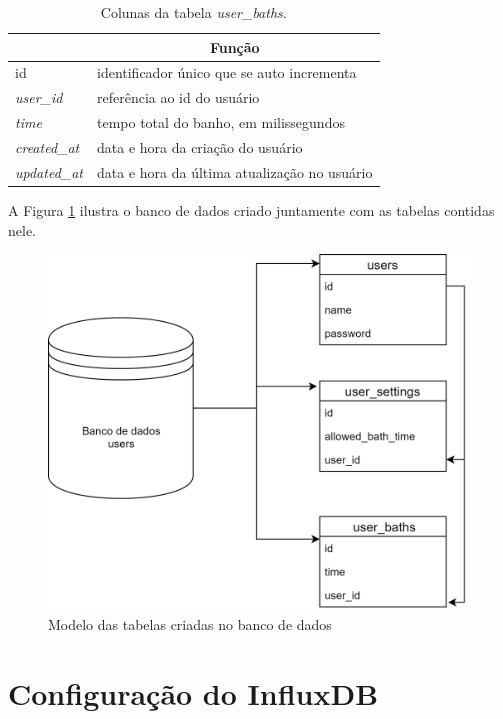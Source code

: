\begin{table}[]
	\centering
	\begin{tabular}{|l|l|}
		\hline
		\rowcolor[HTML]{ECF4FF} 
		\multicolumn{1}{|c|}{\cellcolor[HTML]{ECF4FF}Coluna} & \multicolumn{1}{c|}{\cellcolor[HTML]{ECF4FF}Função} \\ \hline
		id                                                   & identificador único que se auto incrementa          \\ \hline
		\textit{user\_id}                                    & referência ao id do usuário                         \\ \hline
		\textit{time}                                        & tempo total do banho, em milissegundos              \\ \hline
		\textit{created\_at}                                 & data e hora da criação do usuário                   \\ \hline
		\textit{updated\_at}                                 & data e hora da última atualização no usuário        \\ \hline
	\end{tabular}
	\caption{Colunas da tabela \textit{user\_baths}.}
	\label{tab:user-baths}
\end{table}

A Figura \ref{fig:modeltables} ilustra o banco de dados criado juntamente com as tabelas contidas nele.

\begin{figure}[htbp]
	\centering
	\includegraphics[width=0.6\linewidth]{figuras/bancousers.png}
	\caption{Modelo das tabelas criadas no banco de dados}
	\label{fig:modeltables}
\end{figure}

\newpage

\section{Configuração do InfluxDB}


